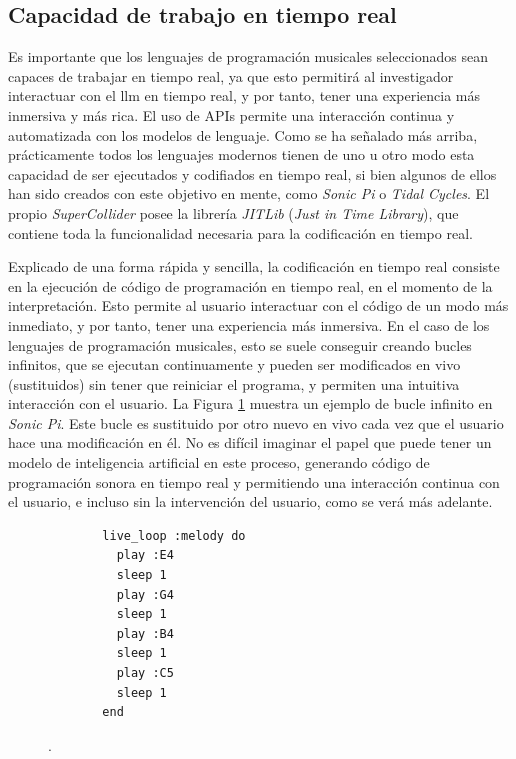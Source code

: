 \subsection{Capacidad de trabajo en tiempo real}
Es importante que los lenguajes de programación musicales seleccionados sean capaces de trabajar en tiempo real, ya que esto permitirá al investigador interactuar con el \gls{llm} en tiempo real, y por tanto, tener una experiencia más inmersiva y más rica. El uso de APIs permite una interacción continua y automatizada con los modelos de lenguaje. Como se ha señalado más arriba, prácticamente todos los lenguajes modernos tienen de uno u otro modo esta capacidad de ser ejecutados y codifiados en tiempo real, si bien algunos de ellos han sido creados con este objetivo en mente, como \emph{Sonic Pi} o \emph{Tidal Cycles}. El propio \emph{SuperCollider} posee la librería \emph{JITLib} (\emph{Just in Time Library}), que contiene toda la funcionalidad necesaria para la codificación en tiempo real.

Explicado de una forma rápida y sencilla, la codificación en tiempo real consiste en la ejecución de código de programación en tiempo real, en el momento de la interpretación. Esto permite al usuario interactuar con el código de un modo más inmediato, y por tanto, tener una experiencia más inmersiva. En el caso de los lenguajes de programación musicales, esto se suele conseguir creando bucles infinitos, que se ejecutan continuamente y pueden ser modificados en vivo (sustituidos) sin tener que reiniciar el programa, y permiten una intuitiva interacción con el usuario. La Figura \ref{fig:sonic_pi_loop} muestra un ejemplo de bucle infinito en \emph{Sonic Pi}. Este bucle es sustituido por otro nuevo en vivo cada vez que el usuario hace una modificación en él. No es difícil imaginar el papel que puede tener un modelo de inteligencia artificial en este proceso, generando código de programación sonora en tiempo real y permitiendo una interacción continua con el usuario, e incluso sin la intervención del usuario, como se verá más adelante.


\begin{figure}[h]
  \caption[Bucle infinito en \emph{Sonic Pi}]{Bucle infinito en \emph{Sonic Pi}. En este código se ejecutan cuatro notas (con la sentencia \texttt{play}), una por segundo (tiempo indicado a \texttt{sleep}) en un bucle infinito. El usuario puede modificar las notas, y el cambio se ejecuta en el siguiente ciclo del bucle.}
  \centering
  \begin{subfigure}{.5\textwidth}
  \begin{mdframed}
  \begin{verbatim}
  live_loop :melody do
    play :E4
    sleep 1
    play :G4
    sleep 1
    play :B4
    sleep 1
    play :C5
    sleep 1
  end
  \end{verbatim}
  \end{mdframed}
  \end{subfigure}
  .
  \label{fig:sonic_pi_loop}
\end{figure}

